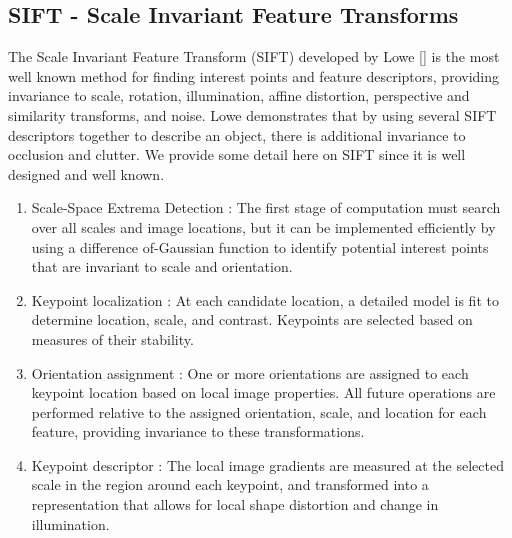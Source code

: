 \subsection{SIFT - Scale Invariant Feature Transforms} \label{siftSection}

The Scale Invariant Feature Transform (SIFT) developed by Lowe \ref{} is the most well known method for finding interest points and feature descriptors, providing invariance to scale, rotation, illumination, affine distortion, perspective and similarity
transforms, and noise. Lowe demonstrates that by using several SIFT descriptors together to describe an object, there is additional invariance to occlusion and clutter. We provide some detail here on SIFT since it is well designed and well known.


\begin{enumerate}
\item Scale-Space Extrema Detection :
The first stage of computation must search over all
scales and image locations, but it can be implemented efficiently by using a difference of-Gaussian
function to identify potential interest points that are invariant to scale and
orientation.
\item Keypoint localization :
At each candidate location, a detailed model is fit to determine
location, scale, and contrast. Keypoints are selected based on measures of their
stability.
\item Orientation assignment :
One or more orientations are assigned to each keypoint
location based on local image properties. All future operations are performed relative
to the assigned orientation, scale, and location for each feature, providing invariance
to these transformations.
\item Keypoint descriptor  :
The local image gradients are measured at the selected scale
in the region around each keypoint, and transformed into a representation that allows
for local shape distortion and change in illumination.
\end{enumerate}

